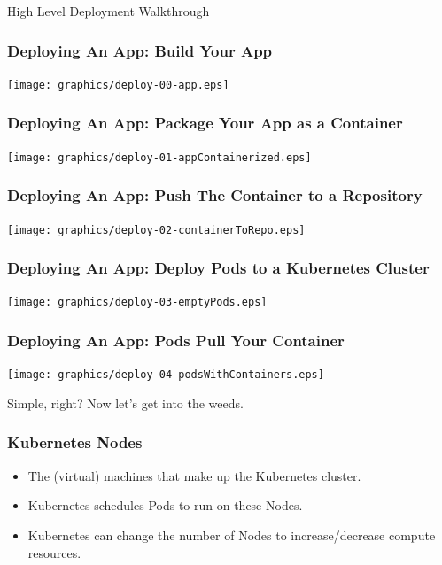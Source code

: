 \begin{frame}
    \begin{center}
        \Huge High Level Deployment Walkthrough
    \end{center}
\end{frame}

\begin{frame}
    \frametitle{Deploying An App: Build Your App}
    \texttt{[image: graphics/deploy-00-app.eps]}
\end{frame}

\begin{frame}
    \frametitle{Deploying An App: Package Your App as a Container}
    \texttt{[image: graphics/deploy-01-appContainerized.eps]}
\end{frame}

\begin{frame}
    \frametitle{Deploying An App: Push The Container to a Repository}
    \texttt{[image: graphics/deploy-02-containerToRepo.eps]}
\end{frame}

\begin{frame}
    \frametitle{Deploying An App: Deploy Pods to a Kubernetes Cluster}
    \texttt{[image: graphics/deploy-03-emptyPods.eps]}
\end{frame}

\begin{frame}
    \frametitle{Deploying An App: Pods Pull Your Container}
    \texttt{[image: graphics/deploy-04-podsWithContainers.eps]}
\end{frame}

\begin{frame}
    \begin{center}
        \Huge Simple, right? Now let's get into the weeds.
    \end{center}
\end{frame}

\begin{frame}
    \frametitle{Kubernetes Nodes}
    \begin{itemize}
        \item The (virtual) machines that make up the Kubernetes cluster.\pause
        \item Kubernetes schedules Pods to run on these Nodes.\pause
        \item Kubernetes can change the number of Nodes to increase/decrease compute resources.
    \end{itemize}
\end{frame}

